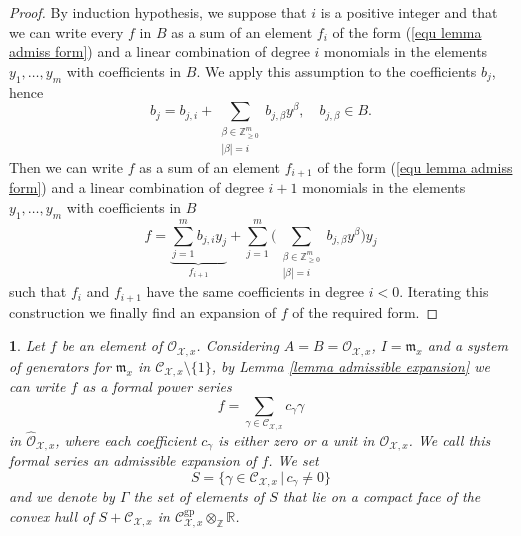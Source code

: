 \documentclass{amsart}%
\numberwithin{equation}{subsection}
\theoremstyle{plain2}
\theoremstyle{definition2}
\theoremstyle{stepstyle}
\theoremstyle{point}
\theoremstyle{subpoint}
\newtheorem{subpoint}[equation]{}%
\newcommand{\spa}[1]{\begin{subpoint}#1\end{subpoint}}           %
\newcommand{\N}{\ensuremath{\mathbb{N}}}
\newcommand{\Z}{\ensuremath{\mathbb{Z}}}
\newcommand{\R}{\ensuremath{\mathbb{R}}}
\newcommand{\cX}{\ensuremath{\mathscr{X}}}
\newcommand{\caC}{\ensuremath{\mathcal{C}}}
\newcommand{\caO}{\ensuremath{\mathcal{O}}}
\renewcommand{\R}{\ensuremath{\mathbb{R}}}
\newcommand{\gp}{\mathrm{gp}}
\begin{document}
{\begin{proof}
By induction hypothesis, we suppose that $i$ is a positive integer and that we can write every $f$ in $B$ as a sum of an element $f_i$ of the form (\ref{equ lemma admiss form}) and a linear combination of degree $i$ monomials in the elements $y_1,\ldots, y_m$ with coefficients in $B$. We apply this assumption to the coefficients $b_j$, hence
$$b_j=b_{j,i} + \sum_{\substack{\beta \in \Z^m_{\geqslant 0} \\|\beta|=i}} b_{j,\beta} y^\beta, \quad b_{j, \beta} \in B.$$ Then we can write $f$ as a sum of an element $f_{i+1}$ of the form (\ref{equ lemma admiss form}) and a linear combination of degree $i+1$ monomials in the elements $y_1,\ldots,y_m$ with coefficients in $B$
$$ f=\underbrace{\sum_{j=1}^{m} b_{j,i} y_j}_{f_{i+1}} + \sum_{j=1}^{m}\Big( \sum_{\substack{\beta \in \Z^m_{\geqslant 0} \\|\beta|=i}} b_{j,\beta} y^\beta \Big) y_j$$ such that $f_i$ and $f_{i+1}$ have the same coefficients in degree $i < 0$. Iterating this construction we finally find an expansion of $f$ of the required form.
\end{proof}}

\spa{ \label{paragr admissible expansion}Let $f$ be an element of $\mathcal{O}_{\cX,x}$. Considering $A=B=\caO_{\cX,x}$, $I=\mathfrak{m}_x$ and a system of generators for $\mathfrak{m}_x$ in $\caC_{\cX,x} \setminus \{1\}$, by Lemma \ref{lemma admissible expansion} we can write $f$ as a formal power series
\begin{equation}\label{eq-adm}
f=\sum_{\gamma \in \mathcal{C}_{\cX,x}}c_{\gamma}\gamma
\end{equation}
 in
$\widehat{\mathcal{O}}_{\cX,x}$, where each coefficient $c_\gamma$
 is either zero or a unit in $\mathcal{O}_{\cX,x}$. We call this formal series an \textit{admissible expansion} of $f$. We set
 \begin{equation}\label{equ def S}
S=\{\gamma\in\mathcal{C}_{\cX,x}\,|\,c_\gamma\neq 0\}
 \end{equation} and we denote by $\Gamma$ the set of
 elements of $S$ that lie on a compact face of the convex hull of
$S+ \mathcal{C}_{\cX,x}$ in
$\mathcal{C}^{\gp}_{\cX,x}\otimes_{\Z}\R$.}
\end{document}
